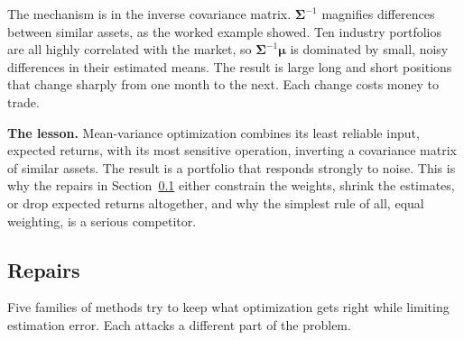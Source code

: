 The mechanism is in the inverse covariance matrix. $\boldsymbol{\Sigma}^{-1}$ magnifies differences between similar assets, as the worked example showed. Ten industry portfolios are all highly correlated with the market, so $\boldsymbol{\Sigma}^{-1}\boldsymbol{\mu}$ is dominated by small, noisy differences in their estimated means. The result is large long and short positions that change sharply from one month to the next. Each change costs money to trade.

\textbf{The lesson.} Mean-variance optimization combines its least reliable input, expected returns, with its most sensitive operation, inverting a covariance matrix of similar assets. The result is a portfolio that responds strongly to noise. This is why the repairs in Section~\ref{sec:12-repairs} either constrain the weights, shrink the estimates, or drop expected returns altogether, and why the simplest rule of all, equal weighting, is a serious competitor.

\subsection{Repairs}
\label{sec:12-repairs}

Five families of methods try to keep what optimization gets right while limiting estimation error. Each attacks a different part of the problem.

